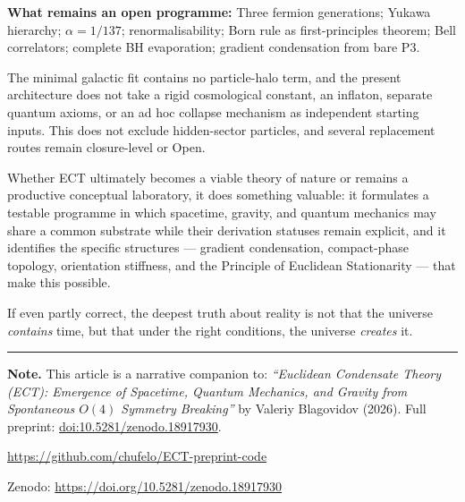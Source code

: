 \documentclass[11pt,a4paper]{article}
\begin{document}
\textbf{What remains an open programme:}
Three fermion generations; Yukawa hierarchy; $\alpha = 1/137$; renormalisability; Born rule as first-principles theorem; Bell correlators; complete BH evaporation; gradient condensation from bare P3.

The minimal galactic fit contains no particle-halo term, and the present architecture does not take a rigid cosmological constant, an inflaton, separate quantum axioms, or an ad hoc collapse mechanism as independent starting inputs.  This does not exclude hidden-sector particles, and several replacement routes remain closure-level or Open.

Whether ECT ultimately becomes a viable theory of nature or remains a productive conceptual laboratory, it does something valuable: it formulates a testable programme in which spacetime, gravity, and quantum mechanics may share a common substrate while their derivation statuses remain explicit, and it identifies the specific structures --- gradient condensation, compact-phase topology, orientation stiffness, and the Principle of Euclidean Stationarity --- that make this possible.

If even partly correct, the deepest truth about reality is not that the universe \emph{contains} time, but that under the right conditions, the universe \emph{creates} it.

\vspace{2em}
\noindent\rule{\textwidth}{0.5pt}

\noindent\textbf{Note.}
This article is a narrative companion to:
\emph{``Euclidean Condensate Theory (ECT): Emergence of Spacetime,
Quantum Mechanics, and Gravity from Spontaneous $O(4)$ Symmetry
Breaking''} by Valeriy Blagovidov (2026).
Full preprint: \href{https://doi.org/10.5281/zenodo.18917930}{doi:10.5281/zenodo.18917930}.

\medskip
\centerline{\url{https://github.com/chufelo/ECT-preprint-code}}
\medskip
\centerline{Zenodo: \url{https://doi.org/10.5281/zenodo.18917930}}
\end{document}

